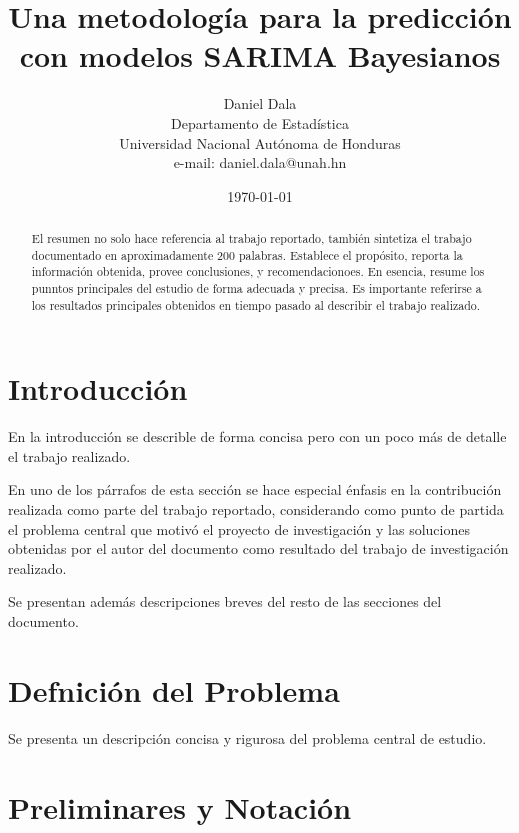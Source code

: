 \documentclass[peerreview]{IEEEtran}
\begin{document}
\title{Una metodología para la predicción con modelos SARIMA Bayesianos}


\author{Daniel Dala\\
Departamento de Estadística\\
Universidad Nacional Aut\'onoma de Honduras\\
e-mail: daniel.dala@unah.hn
}
\date{\today}

\maketitle
\tableofcontents
\listoffigures
\listoftables

\IEEEpeerreviewmaketitle
\begin{abstract}
El resumen no solo hace referencia al trabajo reportado, tambi\'en sintetiza el trabajo documentado en aproximadamente 200 palabras. Establece el prop\'osito, reporta la informaci\'on obtenida, provee conclusiones, y recomendacionoes. En esencia, resume los punntos principales del estudio de forma adecuada y precisa. Es importante referirse a los resultados principales obtenidos en tiempo pasado al describir el trabajo realizado.
\end{abstract}





\section{Introducci\'on}
En la introducci\'on se describle de forma concisa pero con un poco m\'as de detalle el trabajo realizado.

En uno de los p\'arrafos de esta secci\'on se hace especial \'enfasis en la contribuci\'on realizada como parte del trabajo reportado, considerando como punto de partida el problema central que motiv\'o el proyecto de investigaci\'on y las soluciones obtenidas por el autor del documento como resultado del trabajo de investigaci\'on realizado.

Se presentan adem\'as descripciones breves del resto de las secciones del documento.

\section{Defnici\'on del Problema}
Se presenta un descripci\'on concisa y rigurosa del problema central de estudio.

\section{Preliminares y Notaci\'on}
\end{document}
